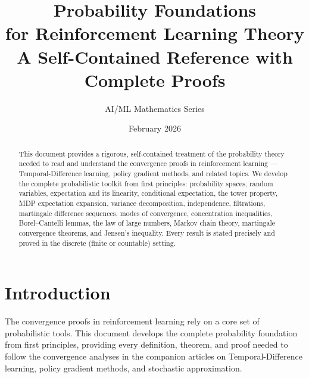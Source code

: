 \documentclass[11pt,a4paper]{article}
\title{\textbf{Probability Foundations\\for Reinforcement Learning Theory}\\[10pt]
\large A Self-Contained Reference with Complete Proofs}
\author{AI/ML Mathematics Series}
\date{February 2026}
\theoremstyle{definition}
\theoremstyle{plain}
\theoremstyle{remark}
\begin{document}
\maketitle

\begin{abstract}
This document provides a rigorous, self-contained treatment of the probability theory
needed to read and understand the convergence proofs in reinforcement learning ---
Temporal-Difference learning, policy gradient methods, and related topics. We develop
the complete probabilistic toolkit from first principles: probability spaces, random
variables, expectation and its linearity, conditional expectation, the tower property,
MDP expectation expansion, variance decomposition, independence, filtrations,
martingale difference sequences, modes of convergence, concentration inequalities,
Borel--Cantelli lemmas, the law of large numbers, Markov chain theory, martingale
convergence theorems, and Jensen's inequality. Every result is stated precisely and
proved in the discrete (finite or countable) setting.
\end{abstract}

\tableofcontents
\newpage

\section{Introduction}
\label{sec:intro}

The convergence proofs in reinforcement learning rely on a core set of probabilistic
tools. This document develops the complete probability foundation from first
principles, providing every definition, theorem, and proof needed to follow the
convergence analyses in the companion articles on Temporal-Difference learning,
policy gradient methods, and stochastic approximation.
\end{document}
